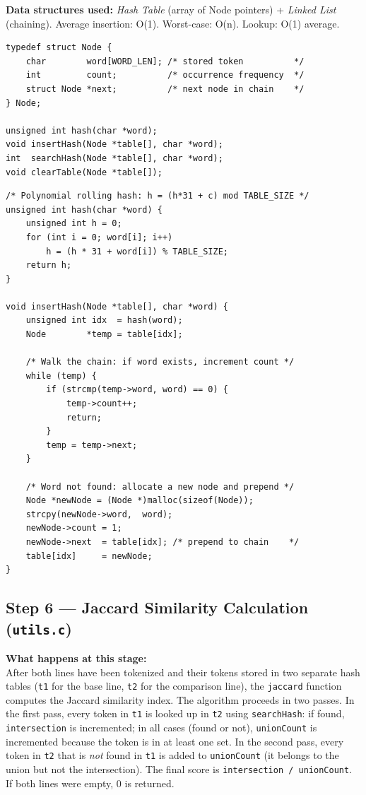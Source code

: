 \documentclass[12pt,a4paper]{article}
\begin{document}
\smallskip
\textbf{Data structures used:} \textit{Hash Table} (array of Node pointers) + \textit{Linked List} (chaining). Average insertion: O(1). Worst-case: O(n). Lookup: O(1) average.

\begin{lstlisting}[caption={\texttt{hash.h} -- Node structure for the hash table / linked list}]
typedef struct Node {
    char        word[WORD_LEN]; /* stored token          */
    int         count;          /* occurrence frequency  */
    struct Node *next;          /* next node in chain    */
} Node;

unsigned int hash(char *word);
void insertHash(Node *table[], char *word);
int  searchHash(Node *table[], char *word);
void clearTable(Node *table[]);
\end{lstlisting}

\begin{lstlisting}[caption={\texttt{hash.c} -- Hash function and insertion with chaining}]
/* Polynomial rolling hash: h = (h*31 + c) mod TABLE_SIZE */
unsigned int hash(char *word) {
    unsigned int h = 0;
    for (int i = 0; word[i]; i++)
        h = (h * 31 + word[i]) % TABLE_SIZE;
    return h;
}

void insertHash(Node *table[], char *word) {
    unsigned int idx  = hash(word);
    Node        *temp = table[idx];

    /* Walk the chain: if word exists, increment count */
    while (temp) {
        if (strcmp(temp->word, word) == 0) {
            temp->count++;
            return;
        }
        temp = temp->next;
    }

    /* Word not found: allocate a new node and prepend */
    Node *newNode = (Node *)malloc(sizeof(Node));
    strcpy(newNode->word,  word);
    newNode->count = 1;
    newNode->next  = table[idx]; /* prepend to chain    */
    table[idx]     = newNode;
}
\end{lstlisting}

\subsection{Step 6 — Jaccard Similarity Calculation (\texttt{utils.c})}

\textbf{What happens at this stage:}\\
After both lines have been tokenized and their tokens stored in two separate hash tables (\texttt{t1} for the base line, \texttt{t2} for the comparison line), the \texttt{jaccard} function computes the Jaccard similarity index. The algorithm proceeds in two passes. In the first pass, every token in \texttt{t1} is looked up in \texttt{t2} using \texttt{searchHash}: if found, \texttt{intersection} is incremented; in all cases (found or not), \texttt{unionCount} is incremented because the token is in at least one set. In the second pass, every token in \texttt{t2} that is \emph{not} found in \texttt{t1} is added to \texttt{unionCount} (it belongs to the union but not the intersection). The final score is \texttt{intersection / unionCount}. If both lines were empty, 0 is returned.
\end{document}
